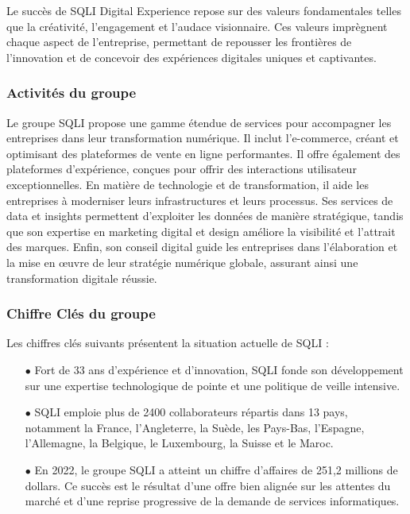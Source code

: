 Le succès de SQLI Digital Experience repose sur des valeurs fondamentales telles que la créativité, l'engagement et l'audace visionnaire. Ces valeurs imprègnent chaque aspect de l'entreprise, permettant de repousser les frontières de l'innovation et de concevoir des expériences digitales uniques et captivantes. \cite{valeurSQLI}

\subsubsection{Activités du groupe}

Le groupe SQLI propose une gamme étendue de services pour accompagner les entreprises dans leur transformation numérique. Il inclut l'e-commerce, créant et optimisant des plateformes de vente en ligne performantes. Il offre également des plateformes d'expérience, conçues pour offrir des interactions utilisateur exceptionnelles. En matière de technologie et de transformation, il aide les entreprises à moderniser leurs infrastructures et leurs processus. Ses services de data et insights permettent d'exploiter les données de manière stratégique, tandis que son expertise en marketing digital et design améliore la visibilité et l'attrait des marques. Enfin, son conseil digital guide les entreprises dans l'élaboration et la mise en œuvre de leur stratégie numérique globale, assurant ainsi une transformation digitale réussie. \cite{SQLI}

\subsubsection{Chiffre Clés du groupe}

Les chiffres clés suivants présentent la situation actuelle de SQLI :

\begin{itemize}
    \item[$\bullet$] Fort de 33 ans d’expérience et d’innovation, SQLI fonde son développement sur une expertise technologique de pointe et une politique de veille intensive.
    \item[$\bullet$] SQLI emploie plus de 2400 collaborateurs répartis dans 13 pays, notamment la France, l'Angleterre, la Suède, les Pays-Bas, l'Espagne, l'Allemagne, la Belgique, le Luxembourg, la Suisse et le Maroc.
    \item[$\bullet$] En 2022, le groupe SQLI a atteint un chiffre d’affaires de 251,2 millions de dollars. Ce succès est le résultat d'une offre bien alignée sur les attentes du marché et d'une reprise progressive de la demande de services informatiques.
    \vspace{0.5cm}
\end{itemize}

